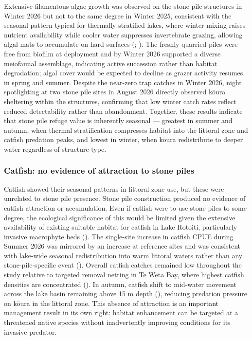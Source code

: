 \documentclass[
  letterpaper,
  DIV=11,
  numbers=noendperiod]{scrartcl}
\begin{document}
Extensive filamentous algae growth was observed on the stone pile
structures in Winter 2026 but not to the same degree in Winter 2025,
consistent with the seasonal pattern typical for thermally stratified
lakes, where winter mixing raises nutrient availability while cooler
water suppresses invertebrate grazing, allowing algal mats to accumulate
on hard surfaces (;
). The freshly quarried
piles were free from biofilm at deployment and by Winter 2026 supported
a diverse meiofaunal assemblage, indicating active succession rather
than habitat degradation; algal cover would be expected to decline as
grazer activity resumes in spring and summer. Despite the near-zero trap
catches in Winter 2026, night spotlighting at two stone pile sites in
August 2026 directly observed kōura sheltering within the structures,
confirming that low winter catch rates reflect reduced detectability
rather than abandonment. Together, these results indicate that stone
pile refuge value is inherently seasonal --- greatest in summer and
autumn, when thermal stratification compresses habitat into the littoral
zone and catfish predation peaks, and lowest in winter, when kōura
redistribute to deeper water regardless of structure type.

\subsubsection{Catfish: no evidence of attraction to stone
piles}\label{catfish-no-evidence-of-attraction-to-stone-piles}

Catfish showed their seasonal patterns in littoral zone use, but these
were unrelated to stone pile presence. Stone pile construction produced
no evidence of catfish attraction or accumulation. Even if catfish were
to use stone piles to some degree, the ecological significance of this
would be limited given the extensive availability of existing suitable
habitat for catfish in Lake Rotoiti, particularly invasive macrophyte
beds (). The single-site
increase in catfish CPUE during Summer 2026 was mirrored by an increase
at reference sites and was consistent with lake-wide seasonal
redistribution into warm littoral waters rather than any
stone-pile-specific event (). Overall catfish catches remained low throughout the study
relative to targeted removal netting in Te Weta Bay, where highest
catfish densities are concentrated (). In autumn, catfish shift to mid-water movement across the lake
basin remaining above 15 m depth
(), reducing
predation pressure on kōura in the littoral zone. This absence of
attraction is an important management result in its own right: habitat
enhancement can be targeted at a threatened native species without
inadvertently improving conditions for its invasive predator.
\end{document}
